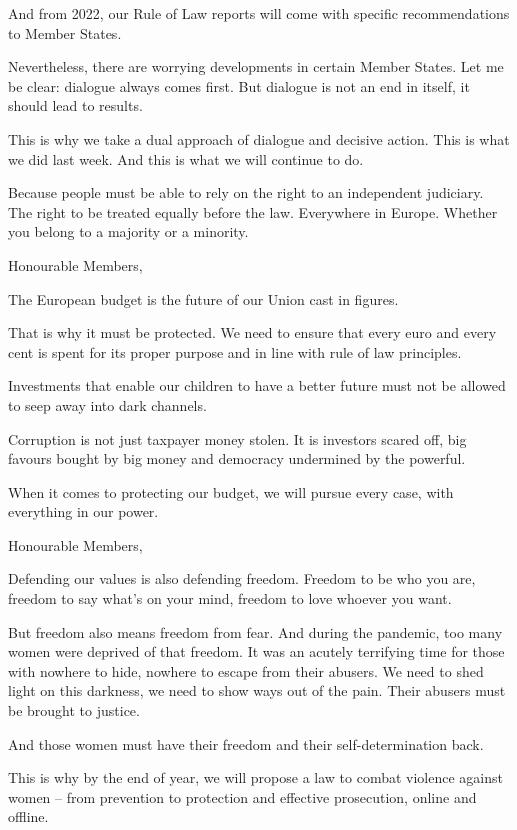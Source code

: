 \documentclass[a4paper,11pt]{article}
\begin{document}
And from 2022, our Rule of Law reports will come with specific recommendations to Member States.

Nevertheless, there are worrying developments in certain Member States. Let me be clear: dialogue always comes first. But dialogue is not an end in itself, it should lead to results.

This is why we take a dual approach of dialogue and decisive action. This is what we did last week. And this is what we will continue to do.

Because people must be able to rely on the right to an independent judiciary. The right to be treated equally before the law. Everywhere in Europe. Whether you belong to a majority or a minority.

 

Honourable Members,

The European budget is the future of our Union cast in figures.

That is why it must be protected. We need to ensure that every euro and every cent is spent for its proper purpose and in line with rule of law principles.

Investments that enable our children to have a better future must not be allowed to seep away into dark channels.

Corruption is not just taxpayer money stolen.  It is investors scared off, big favours bought by big money and democracy undermined by the powerful.

When it comes to protecting our budget, we will pursue every case, with everything in our power. 

 

Honourable Members,

Defending our values is also defending freedom. Freedom to be who you are, freedom to say what's on your mind, freedom to love whoever you want.

But freedom also means freedom from fear. And during the pandemic, too many women were deprived of that freedom. It was an acutely terrifying time for those with nowhere to hide, nowhere to escape from their abusers. We need to shed light on this darkness, we need to show ways out of the pain. Their abusers must be brought to justice.

And those women must have their freedom and their self-determination back.

This is why by the end of year, we will propose a law to combat violence against women – from prevention to protection and effective prosecution, online and offline.
\end{document}
